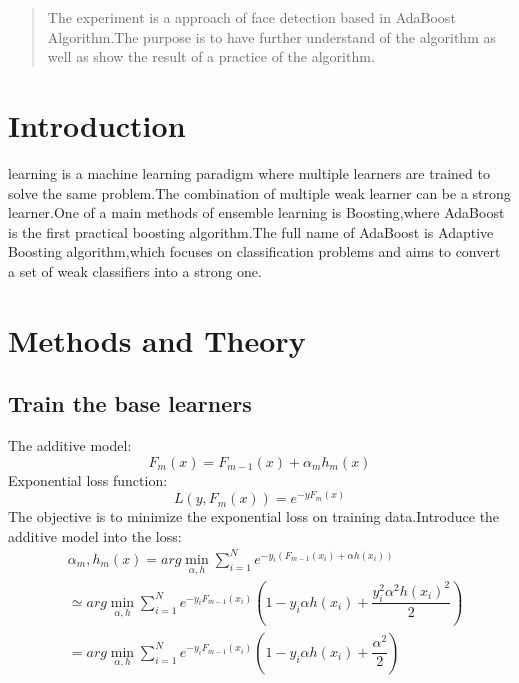 \documentclass[journal, a4paper]{IEEEtran}
\begin{document}
\begin{abstract}
The experiment is a approach of face detection based in AdaBoost Algorithm.The purpose is to have further understand of the algorithm as well as show the result of a practice of the algorithm.
\end{abstract}

\section{Introduction}
 learning is a machine learning paradigm where multiple learners are trained to solve the same problem.The combination of multiple weak learner can be a strong learner.One of a main methods of ensemble learning is Boosting,where AdaBoost is the first practical boosting algorithm.The full name of AdaBoost is Adaptive Boosting algorithm,which focuses on classification problems and aims to convert a set of weak classifiers into a strong one.

\section{Methods and Theory}
\subsection{Train the base learners}
The additive model:
\begin{equation}
F_{m}(x)=F_{m-1}(x)+\alpha_{m}h_{m}(x)
\end{equation}
Exponential loss function:
$$L(y,F_{m}(x))=e^{-yF_{m}(x)}$$
The objective is to minimize the exponential loss on training data.Introduce the additive model into the loss:
\begin{equation}
\begin{aligned}
&{\alpha _{m},h_{m}(x)}=arg\min_{\alpha ,h}\sum_{i=1}^{N}e^{-y_{i}(F_{m-1}(x_{i})+\alpha h(x_{i}))}\\&\simeq arg\min_{\alpha ,h}\sum _{i=1}^{N}e^{-y_{i}F_{m-1}(x_{i})}(1-y_{i}\alpha h(x_{i})+\dfrac{y_{i}^{2}\alpha ^{2}h(x_{i})^{2}}{2})\\&=arg\min_{\alpha ,h}\sum_{i=1}^{N}e^{-y_{i}F_{m-1}(x_{i})}(1-y_{i}\alpha h(x_{i})+\dfrac{\alpha ^{2}}{2})\\
\end{aligned}
\end{equation}
\end{document}
